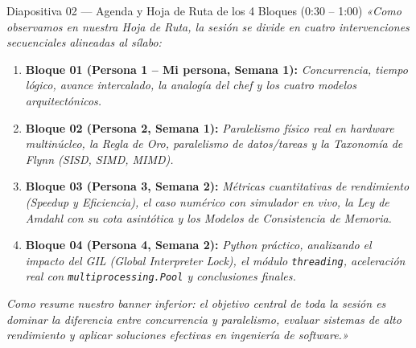 \documentclass[11pt,a4paper]{article}
\begin{document}
\begin{guionbox}{Diapositiva 02 --- Agenda y Hoja de Ruta de los 4 Bloques (0:30 -- 1:00)}
\textit{«Como observamos en nuestra Hoja de Ruta, la sesión se divide en cuatro intervenciones secuenciales alineadas al sílabo:}

\begin{enumerate}[leftmargin=5mm]
    \item \textbf{Bloque 01 (Persona 1 -- Mi persona, Semana 1):} \textit{Concurrencia, tiempo lógico, avance intercalado, la analogía del chef y los cuatro modelos arquitectónicos.}
    \item \textbf{Bloque 02 (Persona 2, Semana 1):} \textit{Paralelismo físico real en hardware multinúcleo, la Regla de Oro, paralelismo de datos/tareas y la Taxonomía de Flynn (SISD, SIMD, MIMD).}
    \item \textbf{Bloque 03 (Persona 3, Semana 2):} \textit{Métricas cuantitativas de rendimiento (Speedup y Eficiencia), el caso numérico con simulador en vivo, la Ley de Amdahl con su cota asintótica y los Modelos de Consistencia de Memoria.}
    \item \textbf{Bloque 04 (Persona 4, Semana 2):} \textit{Python práctico, analizando el impacto del GIL (\textit{Global Interpreter Lock}), el módulo \texttt{threading}, aceleración real con \texttt{multiprocessing.Pool} y conclusiones finales.}
\end{enumerate}

\textit{Como resume nuestro banner inferior: el objetivo central de toda la sesión es dominar la diferencia entre concurrencia y paralelismo, evaluar sistemas de alto rendimiento y aplicar soluciones efectivas en ingeniería de software.»}
\end{guionbox}
\end{document}
